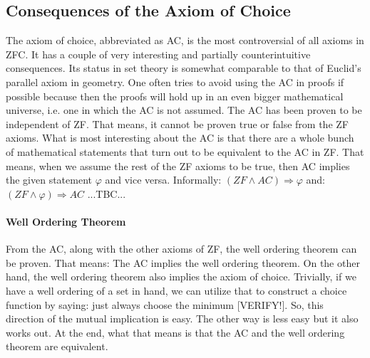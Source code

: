 






\subsection{Consequences of the Axiom of Choice}
The axiom of choice, abbreviated as AC, is the most controversial of all axioms in ZFC. It has a couple of very interesting and partially counterintuitive consequences. Its status in set theory is somewhat comparable to that of Euclid's parallel axiom in geometry. One often tries to avoid using the AC in proofs if possible because then the proofs will hold up in an even bigger mathematical universe, i.e. one in which the AC is not assumed. The AC has been proven to be independent of ZF. That means, it cannot be proven true or false from the ZF axioms. What is most interesting about the AC is that there are a whole bunch of mathematical statements that turn out to be equivalent to the AC in ZF. That means, when we assume the rest of the ZF axioms to be true, then AC implies the given statement $\varphi$ and vice versa. Informally: $(ZF \wedge AC) \Rightarrow \varphi$ and: $(ZF \wedge \varphi) \Rightarrow AC$   ...TBC...

\paragraph{Well Ordering Theorem} 
From the AC, along with the other axioms of ZF, the well ordering theorem can be proven. That means: The AC implies the well ordering theorem. On the other hand, the well ordering theorem also implies the axiom of choice. Trivially, if we have a well ordering of a set in hand, we can utilize that to construct a choice function by saying: just always choose the minimum [VERIFY!]. So, this direction of the mutual implication is easy. The other way is less easy but it also works out. At the end, what that means is that the AC and the well ordering theorem are equivalent.

